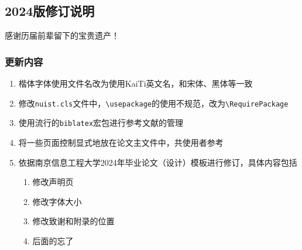 \subsection*{2024版修订说明}

感谢历届前辈留下的宝贵遗产！

\subsubsection*{更新内容}

\begin{enumerate}
\item 楷体字体使用文件名改为使用KaiTi英文名，和宋体、黑体等一致
\item 修改\verb|nuist.cls|文件中，\verb|\usepackage|的使用不规范，改为\verb|\RequirePackage|
\item 使用流行的\verb|biblatex|宏包进行参考文献的管理
\item 将一些页面控制显式地放在论文主文件中，共使用者参考
\item 依据南京信息工程大学2024年毕业论文（设计）模板进行修订，具体内容包括
  \begin{enumerate}
  \item 修改声明页
  \item 修改字体大小
  \item 修改致谢和附录的位置
  \item 后面的忘了
  \end{enumerate}
\end{enumerate}



